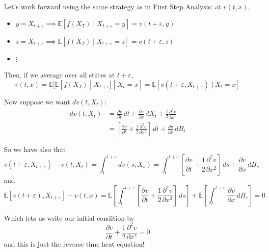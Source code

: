 \documentclass[12pt]{report}
\newcommand{\E}{\mathbb{E}}
\newcommand{\ep}{\varepsilon}
\begin{document}
    Let's work forward using the same strategy as in First Step Analysis: at $v(t, x)$, 
    \begin{itemize}
        \item $y = X_{t+\ep} \implies \E[f(X_T) \; | \; X_{t+\ep} = y] = v(t+\ep, y)$
        \item $z = X_{t +\ep} \implies \E[f(X_T) \; | \; X_{t+\ep} = z] = v(t+\ep, z)$
        \item $\vdots$
    \end{itemize}

    Then, if we average over all states at $t + \ep$, 
    \[v(t,x) = \E[\E[f(X_T) \; | \; X_{t+\ep}] \; | \; X_t = x] = \E[v(t+ \ep, X_{t+\ep}) \; | \; X_t = x]\]

    Now suppose we want $dv(t, X_t)$:
    \begin{align*}
        dv(t, X_t) &= \frac{\partial v}{\partial t}\, dt + \frac{\partial v}{\partial x}\, dX_t  + \frac{1}{2}\frac{\partial^2 v}{\partial t^2}\\ 
        &= \left[\frac{\partial v}{\partial t} + \frac{1}{2}\frac{\partial^2 v}{\partial x^2}\right] \, dt + \frac{\partial v}{\partial x}\, dB_t
    \end{align*}

    So we have also that 
    \[v(t + \ep, X_{t+\ep})- v(t, X_t) = \int_t^{t+\ep} dv(s, X_s) = \int_t^{t+\ep} \left[\frac{\partial v}{\partial t} + \frac{1}{2}\frac{\partial^2 v}{\partial x^2}\right] \, ds + \frac{\partial v}{\partial x}\, dB_s\]
    and 
    \[\E[v(t+\ep), X_{t+\ep}] - v(t,x) = \E\left[\int_t^{t+\ep} \left[\frac{\partial v}{\partial t} + \frac{1}{2}\frac{\partial^2 v}{\partial x^2}\right] \, ds\right] + \E\left[\int_t^{t+\ep} \frac{\partial v}{\partial x}\, dB_s\right] = 0\]

    Which lets us write our initial condition by  
    \[\frac{\partial v}{\partial t} + \frac{1}{2}\frac{\partial^2 v}{\partial x^2} = 0\]
    and this is just the reverse time heat equation! 
\end{document}
